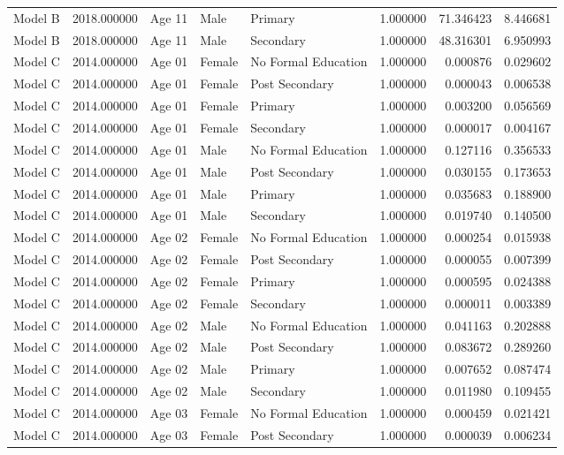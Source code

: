 \begin{table}[ht]
\begin{tabular}{lrlllrrr}
Model B & 2018.000000 & Age 11 & Male & Primary & 1.000000 & 71.346423 & 8.446681 \\
Model B & 2018.000000 & Age 11 & Male & Secondary & 1.000000 & 48.316301 & 6.950993 \\
Model C & 2014.000000 & Age 01 & Female & No Formal Education & 1.000000 & 0.000876 & 0.029602 \\
Model C & 2014.000000 & Age 01 & Female & Post Secondary & 1.000000 & 0.000043 & 0.006538 \\
Model C & 2014.000000 & Age 01 & Female & Primary & 1.000000 & 0.003200 & 0.056569 \\
Model C & 2014.000000 & Age 01 & Female & Secondary & 1.000000 & 0.000017 & 0.004167 \\
Model C & 2014.000000 & Age 01 & Male & No Formal Education & 1.000000 & 0.127116 & 0.356533 \\
Model C & 2014.000000 & Age 01 & Male & Post Secondary & 1.000000 & 0.030155 & 0.173653 \\
Model C & 2014.000000 & Age 01 & Male & Primary & 1.000000 & 0.035683 & 0.188900 \\
Model C & 2014.000000 & Age 01 & Male & Secondary & 1.000000 & 0.019740 & 0.140500 \\
Model C & 2014.000000 & Age 02 & Female & No Formal Education & 1.000000 & 0.000254 & 0.015938 \\
Model C & 2014.000000 & Age 02 & Female & Post Secondary & 1.000000 & 0.000055 & 0.007399 \\
Model C & 2014.000000 & Age 02 & Female & Primary & 1.000000 & 0.000595 & 0.024388 \\
Model C & 2014.000000 & Age 02 & Female & Secondary & 1.000000 & 0.000011 & 0.003389 \\
Model C & 2014.000000 & Age 02 & Male & No Formal Education & 1.000000 & 0.041163 & 0.202888 \\
Model C & 2014.000000 & Age 02 & Male & Post Secondary & 1.000000 & 0.083672 & 0.289260 \\
Model C & 2014.000000 & Age 02 & Male & Primary & 1.000000 & 0.007652 & 0.087474 \\
Model C & 2014.000000 & Age 02 & Male & Secondary & 1.000000 & 0.011980 & 0.109455 \\
Model C & 2014.000000 & Age 03 & Female & No Formal Education & 1.000000 & 0.000459 & 0.021421 \\
Model C & 2014.000000 & Age 03 & Female & Post Secondary & 1.000000 & 0.000039 & 0.006234 \\

\end{tabular}
\end{table}

